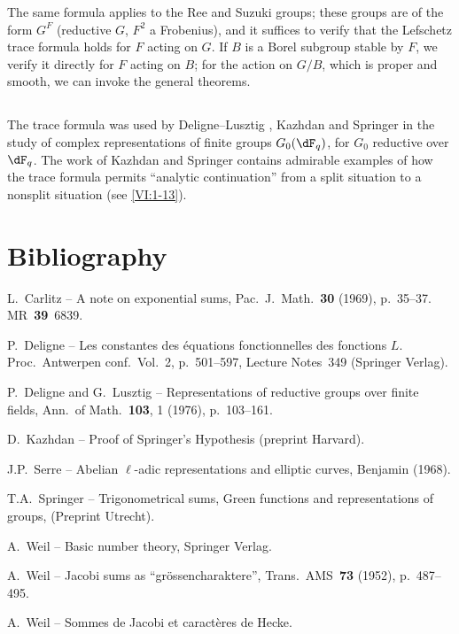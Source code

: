 The same formula applies to the Ree and Suzuki groups; these groups are 
of the form $G^F$ (reductive $G$, $F^2$ a Frobenius), and it suffices to 
verify that the Lefschetz trace formula holds for $F$ acting 
on $G$. If $B$ is a Borel subgroup stable by $F$, we verify it 
directly for $F$ acting on $B$; for the action on $G/B$, which is proper and 
smooth, we can invoke the general theorems. 





\subsection{}\label{VI:8-3}

The trace formula was used by Deligne--Lusztig , 
Kazhdan  and Springer  in the study of 
complex representations of finite groups $G_0(\dF_q)$, for $G_0$ 
reductive over $\dF_q$. The work of Kazhdan and Springer contains 
admirable examples of how the trace formula permits ``analytic 
continuation'' from a split situation to a nonsplit situation 
(see \ref{VI:1-13}).


\section*{Bibliography}
\begin{enumerate}[{[}1{]}]
\item L.~Carlitz -- A note on exponential sums, Pac.~J.~Math.~\textbf{30} (1969), p.~35--37. MR~\textbf{39}~6839.
\item P.~Deligne -- Les constantes des équations fonctionnelles des fonctions $L$.
Proc.~Antwerpen conf.~Vol.~2, p.~501--597, Lecture Notes~349 (Springer Verlag).
\item P.~Deligne and G.~Lusztig -- Representations of reductive groups over finite fields,
Ann.~of Math.~\textbf{103}, 1 (1976), p.~103--161.
\item D.~Kazhdan -- Proof of Springer's Hypothesis (preprint Harvard).
\item J.P.~Serre -- Abelian $\ell$-adic representations and elliptic curves, Benjamin (1968).
\item T.A.~Springer -- Trigonometrical sums, Green functions and representations of
 groups, (Preprint Utrecht).
\item A.~Weil -- Basic number theory, Springer Verlag.
\item A.~Weil -- Jacobi sums as ``gr\"ossencharaktere'', Trans.~AMS~\textbf{73} (1952), p.~487--495.
\item A.~Weil -- Sommes de Jacobi et caractères de Hecke.
\end{enumerate}


